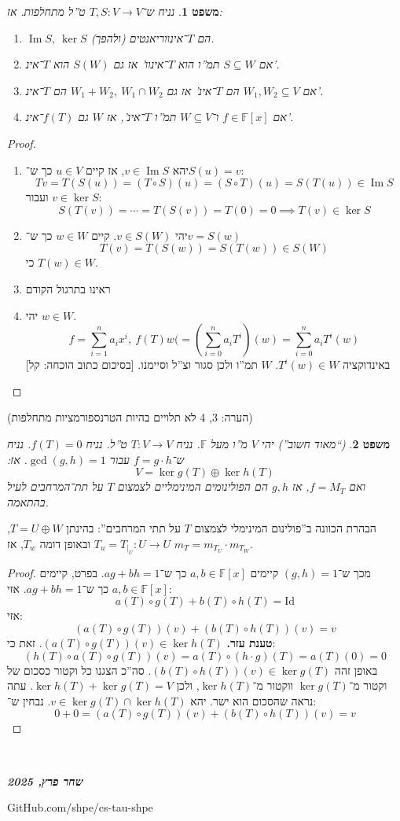 \documentclass[]{article}
\newcommand\en[1] {\begin{otherlanguage}{english}#1\end{otherlanguage}}
\newcommand\ndoc  {\dotfill \\ \vfil {\begin{center}
            {\textbf{\textit{שחר פרץ, 2025}} \\
                \scriptsize \en{GitHub.com/shpe/cs-tau-shpe}}
    \end{center}} \vfil	}
\DeclareMathOperator\Img   {Im}
\newcommand\F         {\mathbb{F}}
\newcommand\co        {\colon}
\newcommand\cl [1]    {\left ( #1 \right )}
\newtheorem{Theorem}{משפט}
\theoremstyle{definition}
\newcommand\theo  [1] {\begin{Theorem}#1\end{Theorem}}
\begin{document}
    \theo{נניח ש־$T, S \co V \to V$ ט''ל מתחלפות. אז: 
    \begin{enumerate}
        \item $\Img S, \ \ker S$ הם $T$־אינווריאנטים (ולהפך). 
        \item אם $S \subseteq W$ תמ''ו הוא $T$־אינוו' אז גם $S(W)$ הוא $T$־אינ'. 
        \item אם $W_1, W_2 \subseteq V$ הם $T$־אינ' אז גם $W_1 + W_2, \ W_1 \cap W_2$ הם $T$־אינ'. 
        \item אם $f \in \F[x]$ ו־$W \subseteq V$ תמ''ו $T$־אינ', אז $W$ גם $f(T)$־אינ'. 
    \end{enumerate}}
    \begin{proof}
        \begin{enumerate}
            \item יהא $v \in \Img S$, אז קיים $u \in V$ כך ש־$S(u) = v$: 
            \[ Tv = T(S(u)) = (T \circ S)(u) = (S \circ T)(u) = S(T(u)) \in \Img S \]
            ועבור $v \in \ker S$: 
            \[ S(T(v)) = \cdots = T(S(v)) = T(0) = 0 \implies T(v) \in \ker S \]
            \item יהי $v \in S(W)$. קיים $w \in W$ כך ש־$v = S(w)$
            \[ T(v) = T(S(w)) = S(T(w)) \in S(W) \]
            כי $T(w) \in W$. 
            \item ראינו בתרגול הקודם
            \item יהי $w \in W$. 
            \[ f = \sum_{i = 1}^{n}a_ix^{i}, \ f(T)w( = \cl{\sum_{i = 0}^{n}a_iT^{i}}(w) = \sum_{i = 0}^{n}a_iT^{i}(w) \]
            באינדוקציה $T^{i}(w) \in W$. $W$ תמ''ו ולכן סגור וצ''ל וסיימנו. [בסיכום כתוב הוכחה: קל]
        \end{enumerate}
    \end{proof}
    (הערה: 3, 4 לא תלויים בהיות הטרנספורמציות מתחלפות)
    \theo{(``מאוד חשוב'') יהי $V$ מ''ו מעל $\F$. נניח $T \co V \to V$ ט''ל. נניח $f(T) = 0$. נניח ש־$f = g \cdot h$ עבור $\gcd(g, h) = 1$. אז: 
        \[ V = \ker g(T) \oplus \ker h(T) \]
        ואם $f = M_T$, אז $g, h$ הם הפולינומים המינימליים לצמצום $T$ על תת־המרחבים לעיל בהתאמה. 
    }
    הבהרת הכוונה ב''פולינום המינימלי לצמצום $T$ על תתי המרחבים'': בהינתן $T = U \oplus W$, $T_u = T_{\mid_U} \co U \to U$ ובאופן דומה $T_w$, אז $m_T = m_{T_U} \cdot m_{T_W}$. 
    \begin{proof}
        מכך ש־$(g, h) = 1$ קיימים $a, b \in \F[x]$ כך ש־$ag + bh = 1$. בפרט, קיימים $a, b \in \F[x]$ כך ש־$ag + bh = 1$. אזי: 
        \[ a(T) \circ g(T) + b(T) \circ h(T) = \mathrm{Id} \]
        אזי: 
        \[ (a(T) \circ g(T))(v) + (b(T) \circ h(T))(v) = v \]
        \textbf{טענת עזר. }$(a(T)\circ g(T))(v) \in \ker h(T)$. זאת כי: 
        \[ (h(T) \circ a(T) \circ g(T))(v) = a(T) \circ (h\cdot g)(T) = a(T)(0) = 0 \]
        באופן זהה $(b(T) \circ h(T))(v) \in \ker g(T)$. סה''כ הצגנו כל וקטור כסכום של וקטור מ־$\ker g(T)$ ווקטור מ־$\ker h(T)$, ולכן $\ker h(T) + \ker g(T) = V$. עתה נראה שהסכום הוא ישר. יהא $v \in \ker g(T) \cap \ker h(T)$. נבחין ש־: 
        \[ 0 + 0 = (a(T) \circ g(T))(v) + (b(T) \circ h(T))(v) = v \]
    \end{proof}
    
    
    \ndoc
\end{document}
